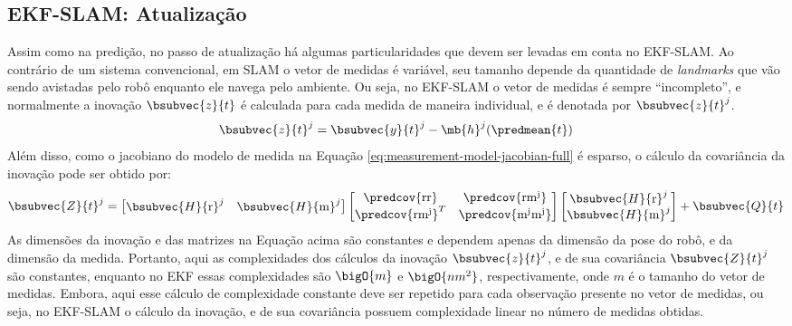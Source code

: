 \subsection{EKF-SLAM: Atualização}
\label{sec:ekf-slam-update}
Assim como na predição, no passo de atualização há algumas particularidades 
que devem ser levadas em conta no EKF-SLAM. Ao contrário de um sistema convencional, em SLAM o vetor de medidas é variável, seu tamanho depende da 
quantidade de \textit{landmarks} que vão sendo avistadas pelo robô enquanto 
ele navega pelo ambiente. Ou seja, no EKF-SLAM o vetor de medidas é sempre 
``incompleto'', e normalmente a inovação $\bsubvec{z}{t}$ é calculada para cada 
medida de maneira individual, e é denotada por $\bsubvec{z}{t}^j$.
\begin{equation}
  \bsubvec{z}{t}^j = \bsubvec{y}{t}^j - \mb{h}^j(\predmean{t})
  \label{eq:ekf-slam-innovation}
\end{equation}
Além disso, como o jacobiano do modelo de medida na Equação \ref{eq:measurement-model-jacobian-full} é esparso, o cálculo da covariância da inovação pode ser obtido por:
\renewcommand{\arraystretch}{1.5}
\begin{equation}
  \bsubvec{Z}{t}^j = \begin{bmatrix}
    \bsubvec{H}{\mathrm{r}}^j & \bsubvec{H}{\mathrm{m}}^j
  \end{bmatrix}
  \begin{bmatrix}
    \predcov{\mathrm{rr}} & \predcov{\mathrm{rm^j}} \\
    \predcov{\mathrm{rm^j}}^T & \predcov{\mathrm{m^j m^j}}
  \end{bmatrix}
  \begin{bmatrix}
    \bsubvec{H}{\mathrm{r}}^j \\ \bsubvec{H}{\mathrm{m}}^j
  \end{bmatrix} + \bsubvec{Q}{t}
  \label{eq:ekf-slam-innovation-covariance}
\end{equation}
\renewcommand{\arraystretch}{1.0}
As dimensões da inovação e das matrizes na Equação acima são constantes e dependem apenas da dimensão da pose do robô, e da dimensão da medida. 
Portanto, aqui as complexidades dos cálculos da inovação $\bsubvec{z}{t}^j$, e de sua covariância $\bsubvec{Z}{t}^j$ são constantes, enquanto no EKF essas complexidades são $\bigO{m}$ e $\bigO{nm^2}$, respectivamente, onde $m$ é o tamanho do vetor de medidas. Embora, aqui esse cálculo de complexidade constante deve ser repetido para cada observação presente no vetor de medidas, ou seja, no EKF-SLAM o cálculo da
inovação, e de sua covariância possuem complexidade linear no número de medidas obtidas.

